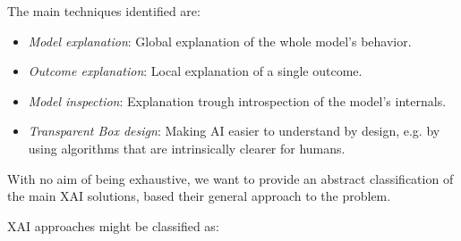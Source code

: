\documentclass[conference]{IEEEtran}
\begin{document}
The main techniques identified are:
\begin{itemize}
    \item \textit{Model explanation}: Global explanation of the whole model's behavior.
    \item \textit{Outcome explanation}: Local explanation of a single outcome.
    \item \textit{Model inspection}: Explanation trough introspection of the model's internals.
    \item \textit{Transparent Box design}: Making AI easier to understand by design, e.g. by using algorithms that are intrinsically clearer for humans.
\end{itemize}

With no aim of being
exhaustive, we want to provide an abstract
classification of the main XAI solutions, based their general approach to the
problem.

XAI approaches might be classified as:
\end{document}
